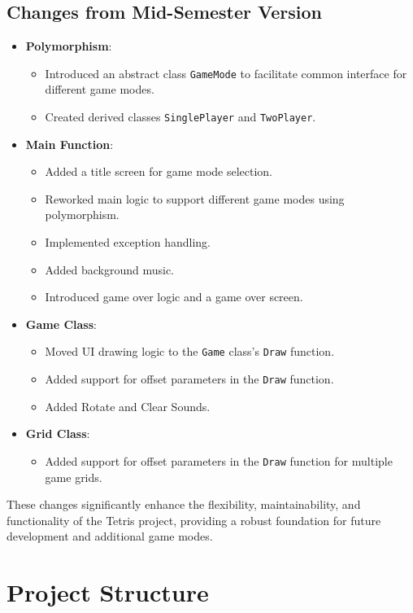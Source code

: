\documentclass{article}
\begin{document}
\subsection{Changes from Mid-Semester Version}
\begin{itemize}
    \item \textbf{Polymorphism}:
    \begin{itemize}
        \item Introduced an abstract class \texttt{GameMode} to facilitate common interface for different game modes.
        \item Created derived classes \texttt{SinglePlayer} and \texttt{TwoPlayer}.
    \end{itemize}
    \item \textbf{Main Function}:
    \begin{itemize}
        \item Added a title screen for game mode selection.
        \item Reworked main logic to support different game modes using polymorphism.
        \item Implemented exception handling.
        \item Added background music.
        \item Introduced game over logic and a game over screen.
    \end{itemize}
    \item \textbf{Game Class}:
    \begin{itemize}
        \item Moved UI drawing logic to the \texttt{Game} class's \texttt{Draw} function.
        \item Added support for offset parameters in the \texttt{Draw} function.
        \item Added Rotate and Clear Sounds.
    \end{itemize}
    \item \textbf{Grid Class}:
    \begin{itemize}
        \item Added support for offset parameters in the \texttt{Draw} function for multiple game grids.
    \end{itemize}
\end{itemize}

These changes significantly enhance the flexibility, maintainability, and functionality of the Tetris project, providing a robust foundation for future development and additional game modes.
\newpage
\section{Project Structure}
\end{document}

